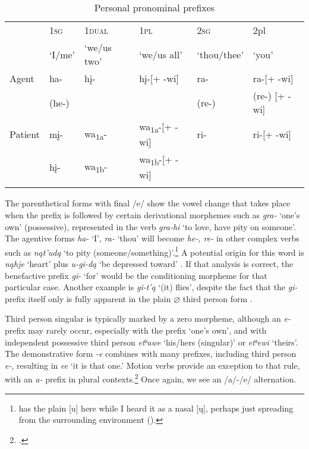 \documentclass[output=paper]{LSP/langsci}
\begin{document}
\begin{table}
\begin{tabular}{ l l l l l l }
\lsptoprule
& 1\textsc{sg} &  1\textsc{dual} & 1\textsc{pl}  & 2\textsc{sg} &  2{pl}  \\
& `I/me' & `we/us two' & `we/us all' & `thou/thee' & `you' \\
\midrule
Agent & ha-  	& h\k{i}- & h\k{i}-[+ -wi] & ra-  & ra-[+ -wi] \\
& (he-) & & &(re-) & (re-) [+ -wi] \\

Patient & m\k{i}- & wa\textsubscript{1a}-	& wa\textsubscript{1a}-[+ -wi]	&  ri- & ri-[+ -wi] \\
& h\k{i}-	& wa\textsubscript{1b}- & wa\textsubscript{1b}-[+ -wi]	& & \\
\lspbottomrule \end{tabular}

\caption{Personal pronominal prefixes} \label{personalpronominals}
\end{table}

 The parenthetical forms with final /e/ show the vowel change that takes place when the prefix is followed by certain derivational morphemes such as \textit{gra-} `one's own' (possessive), represented in the verb \textit{gra-hi} `to love, have pity on someone'.  The agentive forms \textit{ha-} `I', \textit{ra-} `thou' will become \textit{he-, re-} in other complex verbs such as \textit{n\k{a}t'ud\k{a}} `to pity (someone/something)'.\footnote{\citet{Whitman1947} has the plain [u] here while I heard it as a nasal [\k{u}], perhaps just spreading from the surrounding environment (\citealt{Davidson1997}).}  A potential origin for this word is \textit{n\k{a}hje} `heart' plus \textit{u-gi-d\k{a}} `be depressed toward' \citep[243]{Whitman1947}.  If that analysis is correct, the benefactive prefix \textit{gi-} `for' would be the conditioning morpheme for that particular case.  Another example is \textit{gi-t'\k{a}} `(it) flies', despite the fact that the \textit{gi-} prefix itself only is fully apparent in the plain $\varnothing$ third person form \citep[242]{Whitman1947}.    

Third person singular is typically marked by a zero morpheme, although an \textit{e-} prefix may rarely occur, especially with the  prefix `one's own', and with independent possessive third person \textit{etʰawe} `his/hers (singular)' or \textit{etʰewi} `theirs'.  The demonstrative form \textit{-e} combines with many prefixes, including third person \textit{e-}, resulting in \textit{ee} `it is that one.'  Motion verbs provide an exception to that rule, with an \textit{a-} prefix in plural contexts.\footnote{\citet{Marsh1936, Taylor1976a}.}   Once again, we see an /a/-/e/ alternation.  
\end{document}
